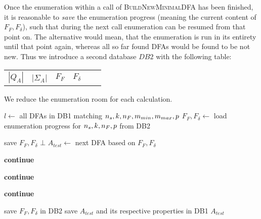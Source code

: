 Once the enumeration within a call of \textsc{BuildNewMinimalDFA} has been finished, it is reasonable to \emph{save} the enumeration progress (meaning the current content of $F_F, F_\delta$), such that during the next call enumeration can be resumed from that point on. The alternative would mean, that the enumeration is run in its entirety until that point again, whereas all so far found DFAs would be found to be not new. Thus we introduce a second database $DB2$ with the following table:
\begin{center}
	\begin{tabular}{c c c c c c}
		$|Q_A|$ & |$\Sigma_A$| & $F_F$ & $F_\delta$
	\end{tabular}
\end{center}
We reduce the enumeration room for each calculation.
\vspace{0.2cm}
\begin{algorithmic}[1]
	
		\vspace{0.2cm}
	
		\State $l \gets$ all DFAs in DB1 matching ${n_s}, k, {n_F}, m_{min}, m_{max}, p$
		\State $F_F, F_\delta \gets$ load enumeration progress for ${n_s}, k, {n_F}, p$ from DB2
		
		\vspace{0.2cm}
		
		
			\vspace{0.2cm}
		
				\State save $F_F, F_\delta$
				\State\Return $\bot$
			\EndIf
			\State $A_{test} \gets$ next DFA based on $F_F, F_\delta$
			
			\vspace{0.2cm}
			
				\State \textbf{continue}
			\EndIf
			
				\State \textbf{continue}
			\EndIf
			
				\State \textbf{continue}
			\EndIf
			
			\vspace{0.2cm}
			
			\State save $F_F, F_\delta$ in DB2
			\State save $A_{test}$ and its respective properties in DB1
			\State\Return $A_{test}$
		\EndWhile
	\EndFunction
\end{algorithmic}
\vspace{0.2cm}

